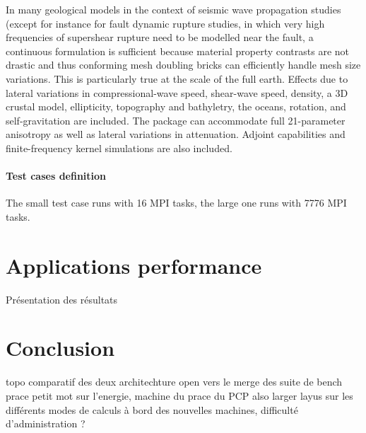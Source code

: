 In many geological models in the context of seismic wave propagation studies (except for instance for fault dynamic rupture studies, in which very high frequencies of supershear rupture need to be modelled near the fault, a continuous formulation is sufficient because material property contrasts are not drastic and thus conforming mesh doubling bricks can efficiently handle mesh size variations. This is particularly true at the scale of the full earth. Effects due to lateral variations in compressional-wave speed, shear-wave speed, density, a 3D crustal model, ellipticity, topography and bathyletry, the oceans, rotation, and self-gravitation are included. The package can accommodate full 21-parameter anisotropy as well as lateral variations in attenuation. Adjoint capabilities and finite-frequency kernel simulations are also included.

\subsection{Test cases definition}
The small test case runs with 16 MPI tasks, the large one runs with 7776 MPI tasks.


\part{Applications performance}
Présentation des résultats

\part{Conclusion}
topo comparatif des deux architechture
open vers le merge des suite de bench prace
petit mot sur l'energie, machine du prace du PCP also larger
layus sur les différents modes de calculs à bord des nouvelles machines, difficulté d'administration ?
